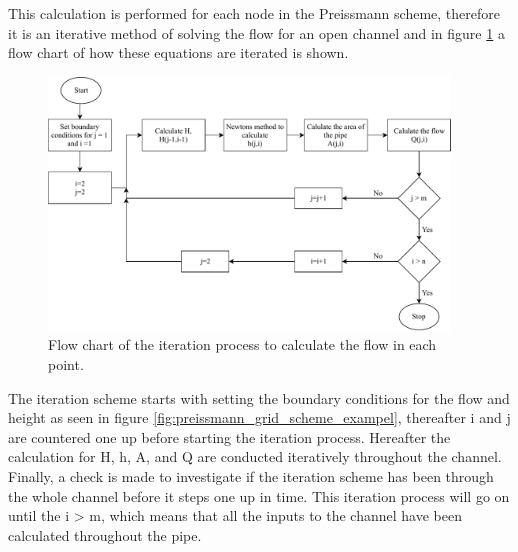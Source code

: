 This calculation is performed for each node in the Preissmann scheme, therefore it is an iterative method of solving the flow for an open channel and in figure \ref{fig:flow_chart_iteration} a flow chart of how these equations are iterated is shown.
\begin{figure}[H]
    \centering
    \includegraphics[width=0.95\textwidth]{report/simulation/pictures/flow_chart_iteration.pdf}
    \caption{Flow chart of the iteration process to calculate the flow in each point.}
    \label{fig:flow_chart_iteration}
\end{figure}

The iteration scheme starts with setting the boundary conditions for the flow and height as seen in figure \ref{fig:preissmann_grid_scheme_exampel}, thereafter i and j are countered one up before starting the iteration process. Hereafter the calculation for H, h, A, and Q are conducted iteratively throughout the channel. Finally, a check is made to investigate if the iteration scheme has been through the whole channel before it steps one up in time. This iteration process will go on until the i > m, which means that all the inputs to the channel have been calculated throughout the pipe.   

